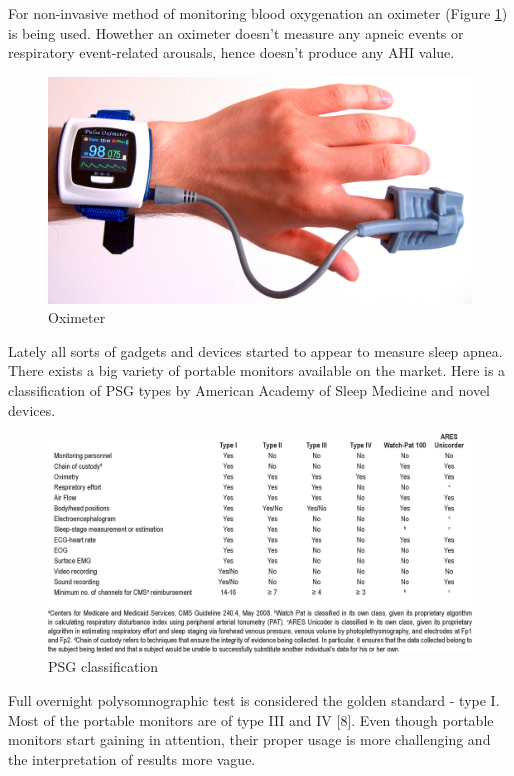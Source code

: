\documentclass[12pt,a4paper]{report}
\begin{document}
For non-invasive method of monitoring blood oxygenation an oximeter (Figure \ref{fig:oximeter}) is being used. Howether an oximeter doesn't measure any apneic events or respiratory event-related arousals, hence doesn't produce any AHI value.

\begin{figure}[h]
\centering
\includegraphics[max height=\textheight, max width=\textwidth, keepaspectratio, scale=0.5]{04_oximeter.jpg}
\caption{Oximeter}
\label{fig:oximeter}
\end{figure}

Lately all sorts of gadgets and devices started to appear to measure sleep apnea. There exists a big variety of portable monitors available on the market. Here is a classification of PSG types by American Academy of Sleep Medicine and novel devices.

\begin{figure}[h]
\centering
\includegraphics[max height=\textheight, max width=\textwidth, keepaspectratio, scale=0.8]{05_psg_classification.jpg}
\caption{PSG classification}
\label{fig:psg_classification}
\end{figure}

Full overnight polysomnographic test is considered the golden standard - type I. Most of the portable monitors are of type III and IV [8]. Even though portable monitors start gaining in attention, their proper usage is more challenging and the interpretation of results more vague.
\end{document}
